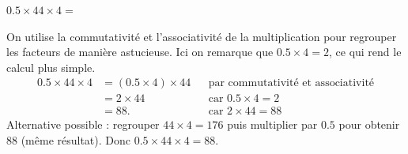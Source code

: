 \documentclass[answers]{exam}
\begin{document}
\begin{questions}
\question $0.5 \times 44 \times 4 =$
\begin{solution}
On utilise la commutativité et l'associativité de la multiplication pour regrouper les facteurs de manière astucieuse. Ici on remarque que $0.5 \times 4 = 2$, ce qui rend le calcul plus simple.
\begin{align*}
0.5 \times 44 \times 4
&= (0.5 \times 4) \times 44 &&\text{par commutativité et associativité} \\
&= 2 \times 44 &&\text{car }0.5 \times 4 = 2 \\
&= 88. &&\text{car }2 \times 44 = 88
\end{align*}
Alternative possible : regrouper $44 \times 4 = 176$ puis multiplier par $0.5$ pour obtenir $88$ (même résultat).
Donc $0.5 \times 44 \times 4 = 88$.
\end{solution}

\end{questions}
\end{document}
